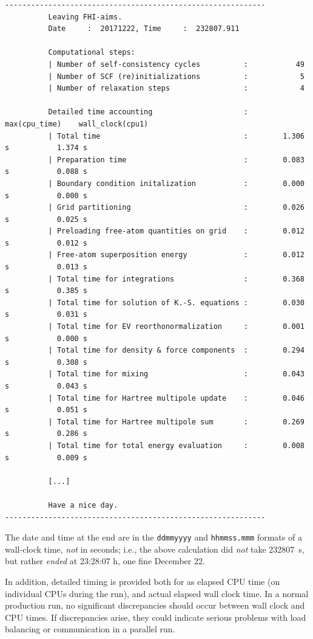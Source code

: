 {\small
\begin{verbatim}
------------------------------------------------------------
          Leaving FHI-aims.
          Date     :  20171222, Time     :  232807.911

          Computational steps:
          | Number of self-consistency cycles          :           49
          | Number of SCF (re)initializations          :            5
          | Number of relaxation steps                 :            4

          Detailed time accounting                     :  max(cpu_time)    wall_clock(cpu1)
          | Total time                                 :        1.306 s           1.374 s
          | Preparation time                           :        0.083 s           0.088 s
          | Boundary condition initalization           :        0.000 s           0.000 s
          | Grid partitioning                          :        0.026 s           0.025 s
          | Preloading free-atom quantities on grid    :        0.012 s           0.012 s
          | Free-atom superposition energy             :        0.012 s           0.013 s
          | Total time for integrations                :        0.368 s           0.385 s
          | Total time for solution of K.-S. equations :        0.030 s           0.031 s
          | Total time for EV reorthonormalization     :        0.001 s           0.000 s
          | Total time for density & force components  :        0.294 s           0.308 s
          | Total time for mixing                      :        0.043 s           0.043 s
          | Total time for Hartree multipole update    :        0.046 s           0.051 s
          | Total time for Hartree multipole sum       :        0.269 s           0.286 s
          | Total time for total energy evaluation     :        0.008 s           0.009 s

          [...]

          Have a nice day.
------------------------------------------------------------
\end{verbatim}
}

The date and time at the end are in the \texttt{ddmmyyyy} and
\texttt{hhmmss.mmm} formats of a wall-clock time, \emph{not} in
seconds; i.e., the above calculation did \emph{not} take 232807~s, but
rather \emph{ended} at 23:28:07 h, one fine December 22. 

In addition, detailed timing is provided both for as elapsed CPU time
(on individual CPUs during the run), and actual elapsed wall clock
time. In a normal production run, no significant discrepancies should
occur between wall clock and CPU times. If discrepancies arise, they
could indicate serious problems with load balancing or communication
in a parallel run.  

